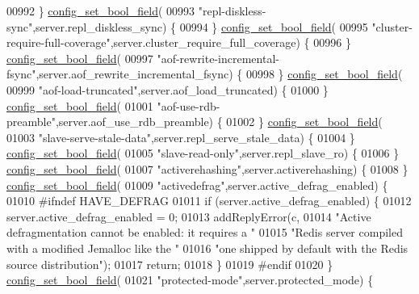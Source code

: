 \begin{DoxyCode}
{{{{{{{{00992     \} \hyperlink{config_8c_a345bb09b35c40e88bc2e2e3c3a1db6b0}{config\_set\_bool\_field}(
00993       \textcolor{stringliteral}{"repl-diskless-sync"},server.repl\_diskless\_sync) \{
00994     \} \hyperlink{config_8c_a345bb09b35c40e88bc2e2e3c3a1db6b0}{config\_set\_bool\_field}(
00995       \textcolor{stringliteral}{"cluster-require-full-coverage"},server.cluster\_require\_full\_coverage) \{
00996     \} \hyperlink{config_8c_a345bb09b35c40e88bc2e2e3c3a1db6b0}{config\_set\_bool\_field}(
00997       \textcolor{stringliteral}{"aof-rewrite-incremental-fsync"},server.aof\_rewrite\_incremental\_fsync) \{
00998     \} \hyperlink{config_8c_a345bb09b35c40e88bc2e2e3c3a1db6b0}{config\_set\_bool\_field}(
00999       \textcolor{stringliteral}{"aof-load-truncated"},server.aof\_load\_truncated) \{
01000     \} \hyperlink{config_8c_a345bb09b35c40e88bc2e2e3c3a1db6b0}{config\_set\_bool\_field}(
01001       \textcolor{stringliteral}{"aof-use-rdb-preamble"},server.aof\_use\_rdb\_preamble) \{
01002     \} \hyperlink{config_8c_a345bb09b35c40e88bc2e2e3c3a1db6b0}{config\_set\_bool\_field}(
01003       \textcolor{stringliteral}{"slave-serve-stale-data"},server.repl\_serve\_stale\_data) \{
01004     \} \hyperlink{config_8c_a345bb09b35c40e88bc2e2e3c3a1db6b0}{config\_set\_bool\_field}(
01005       \textcolor{stringliteral}{"slave-read-only"},server.repl\_slave\_ro) \{
01006     \} \hyperlink{config_8c_a345bb09b35c40e88bc2e2e3c3a1db6b0}{config\_set\_bool\_field}(
01007       \textcolor{stringliteral}{"activerehashing"},server.activerehashing) \{
01008     \} \hyperlink{config_8c_a345bb09b35c40e88bc2e2e3c3a1db6b0}{config\_set\_bool\_field}(
01009       \textcolor{stringliteral}{"activedefrag"},server.active\_defrag\_enabled) \{
01010 \textcolor{preprocessor}{#}\textcolor{preprocessor}{ifndef} \textcolor{preprocessor}{HAVE\_DEFRAG}
01011         \textcolor{keywordflow}{if} (server.active\_defrag\_enabled) \{
01012             server.active\_defrag\_enabled = 0;
01013             addReplyError(c,
01014                 \textcolor{stringliteral}{"Active defragmentation cannot be enabled: it requires a "}
01015                 \textcolor{stringliteral}{"Redis server compiled with a modified Jemalloc like the "}
01016                 \textcolor{stringliteral}{"one shipped by default with the Redis source distribution"});
01017             \textcolor{keywordflow}{return};
01018         \}
01019 \textcolor{preprocessor}{#}\textcolor{preprocessor}{endif}
01020     \} \hyperlink{config_8c_a345bb09b35c40e88bc2e2e3c3a1db6b0}{config\_set\_bool\_field}(
01021       \textcolor{stringliteral}{"protected-mode"},server.protected\_mode) \{
}}}}}}}}
\end{DoxyCode}
